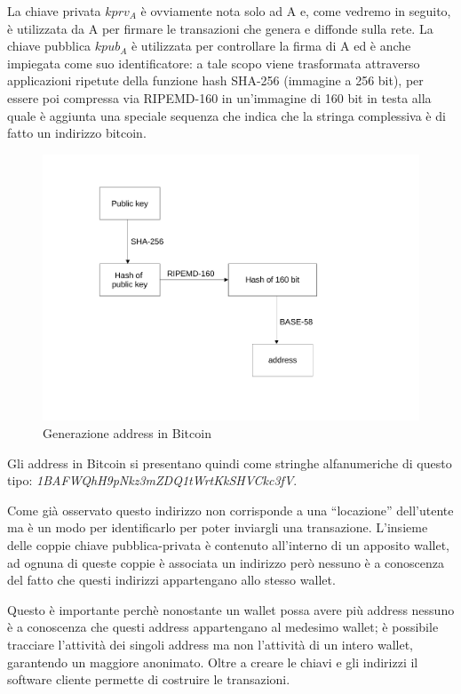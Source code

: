 La chiave privata $kprv_A$ è ovviamente nota solo ad A e, come vedremo in seguito, è utilizzata da A per ﬁrmare le transazioni che genera e diffonde sulla rete. La chiave pubblica $kpub_A$ è utilizzata per controllare la ﬁrma di A ed è anche impiegata come suo identiﬁcatore: a tale scopo viene trasformata attraverso applicazioni ripetute della funzione hash SHA-256 (immagine a 256 bit), per essere poi compressa via RIPEMD-160 in un’immagine di 160 bit in testa alla quale è aggiunta una speciale sequenza che indica che la stringa complessiva è di fatto un indirizzo bitcoin.
\begin{figure}[h!]
    \centering
    \includegraphics[scale=0.5, trim = 1cm 2cm 0cm 2cm, clip]{Images/address_gen.pdf}
    \caption{Generazione address in Bitcoin}
    \label{fig:sha-256_address}
\end{figure}
\FloatBarrier
Gli address in Bitcoin si presentano quindi come stringhe alfanumeriche di questo tipo: \textit{1BAFWQhH9pNkz3mZDQ1tWrtKkSHVCkc3fV}.

Come già osservato questo indirizzo non corrisponde a una “locazione” dell'utente ma è un modo per identiﬁcarlo per poter inviargli una transazione. L'insieme delle coppie chiave pubblica-privata è contenuto all'interno di un apposito wallet, ad ognuna di queste coppie è associata un indirizzo però nessuno è a conoscenza del fatto che questi indirizzi appartengano allo stesso wallet.

Questo è importante perchè nonostante un wallet possa avere più address nessuno è a conoscenza che questi address appartengano al medesimo wallet; è possibile tracciare l’attività dei singoli address ma non l’attività di un intero wallet, garantendo un maggiore anonimato. Oltre a creare le chiavi e gli indirizzi il software cliente permette di costruire le transazioni.

